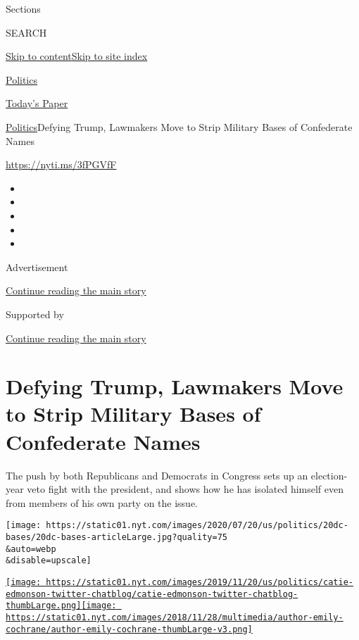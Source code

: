 Sections

SEARCH

\protect\hyperlink{site-content}{Skip to
content}\protect\hyperlink{site-index}{Skip to site index}

\href{https://www.nytimes.com/section/politics}{Politics}

\href{https://myaccount.nytimes.com/auth/login?response_type=cookie\&client_id=vi}{}

\href{https://www.nytimes.com/section/todayspaper}{Today's Paper}

\href{/section/politics}{Politics}\textbar{}Defying Trump, Lawmakers
Move to Strip Military Bases of Confederate Names

\url{https://nyti.ms/3fPGVfF}

\begin{itemize}
\item
\item
\item
\item
\item
\end{itemize}

Advertisement

\protect\hyperlink{after-top}{Continue reading the main story}

Supported by

\protect\hyperlink{after-sponsor}{Continue reading the main story}

\hypertarget{defying-trump-lawmakers-move-to-strip-military-bases-of-confederate-names}{%
\section{Defying Trump, Lawmakers Move to Strip Military Bases of
Confederate
Names}\label{defying-trump-lawmakers-move-to-strip-military-bases-of-confederate-names}}

The push by both Republicans and Democrats in Congress sets up an
election-year veto fight with the president, and shows how he has
isolated himself even from members of his own party on the issue.

\texttt{[image: https://static01.nyt.com/images/2020/07/20/us/politics/20dc-bases/20dc-bases-articleLarge.jpg?quality=75\\\&auto=webp\\\&disable=upscale]}

\href{https://www.nytimes.com/by/catie-edmondson}{\texttt{[image: https://static01.nyt.com/images/2019/11/20/us/politics/catie-edmonson-twitter-chatblog/catie-edmonson-twitter-chatblog-thumbLarge.png]}}\href{https://www.nytimes.com/by/emily-cochrane}{\texttt{[image: https://static01.nyt.com/images/2018/11/28/multimedia/author-emily-cochrane/author-emily-cochrane-thumbLarge-v3.png]}}

